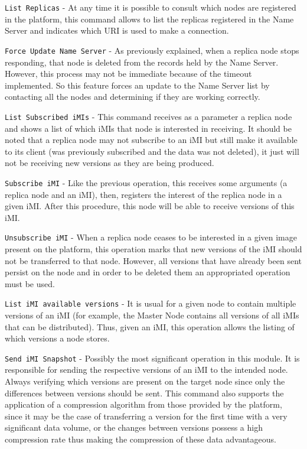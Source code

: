\begin{description}
	\item \texttt{List Replicas} - At any time it is possible to consult which nodes are registered in the platform, this command allows to list the replicas registered in the Name Server and indicates which URI is used to make a connection.
	\item \texttt{Force Update Name Server} - As previously explained, when a replica node stops responding, that node is deleted from the records held by the Name Server. However, this process may not be immediate because of the timeout implemented. So this feature forces an update to the Name Server list by contacting all the nodes and determining if they are working correctly.
	\item \texttt{List Subscribed iMIs} - This command receives as a parameter a replica node and shows a list of which iMIs that node is interested in receiving. It should be noted that a replica node may not subscribe to an iMI but still make it available to its client (was previously subscribed and the data was not deleted), it just will not be receiving new versions as they are being produced.
	\item \texttt{Subscribe iMI} - Like the previous operation, this receives some arguments (a replica node and an iMI), then, registers the interest of the replica node in a given iMI. After this procedure, this node will be able to receive versions of this iMI.
	\item \texttt{Unsubscribe iMI} - When a replica node ceases to be interested in a given image present on the platform, this operation marks that new versions of the iMI should not be transferred to that node. However, all versions that have already been sent persist on the node and in order to be deleted them an appropriated operation must be used.
	\item \texttt{List iMI available versions} - It is usual for a given node to contain multiple versions of an iMI (for example, the Master Node contains all versions of all iMIs that can be distributed). Thus, given an iMI, this operation allows the listing of which versions a node stores.
	\item \texttt{Send iMI Snapshot} - Possibly the most significant operation in this module. It is responsible for sending the respective versions of an iMI to the intended node. Always verifying which versions are present on the target node since only the differences between versions should be sent. This command also supports the application of a compression algorithm from those provided by the platform, since it may be the case of transferring a version for the first time with a very significant data volume, or the changes between versions possess a high compression rate thus making the compression of these data advantageous.

\end{description}
